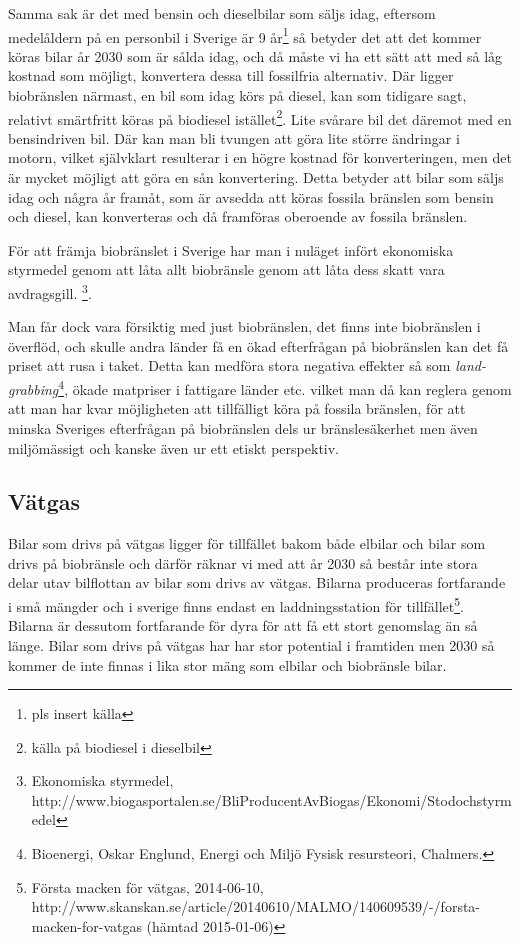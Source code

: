 \documentclass[a4paper,11pt,fleqn, titlepage]{article}
\begin{document}
Samma sak är det med bensin och dieselbilar som säljs idag, eftersom
medelåldern på en personbil i Sverige är 9 år\footnote{pls insert
källa} så betyder det att det kommer köras bilar år 2030 som är sålda idag,
och då måste vi ha ett sätt att med så låg kostnad som möjligt, konvertera
dessa till fossilfria alternativ. Där ligger biobränslen närmast, en bil
som idag körs på diesel, kan som tidigare sagt, relativt smärtfritt köras
på biodiesel istället\footnote{källa på biodiesel i dieselbil}. Lite
svårare bil det däremot med en bensindriven bil. Där kan man bli tvungen
att göra lite större ändringar i motorn, vilket självklart resulterar i en
högre kostnad för konverteringen, men det är mycket möjligt att göra en sån
konvertering. Detta betyder att bilar som säljs idag och några år framåt,
som är avsedda att köras fossila bränslen som bensin och diesel, kan
konverteras och då framföras oberoende av fossila bränslen.

För att främja biobränslet i Sverige har man i nuläget infört ekonomiska styrmedel 
genom att låta allt biobränsle genom att låta dess skatt vara
avdragsgill.
\footnote{Ekonomiska styrmedel, \\
http://www.biogasportalen.se/BliProducentAvBiogas/Ekonomi/Stodochstyrmedel}.

Man får dock vara försiktig med just biobränslen, det finns inte
biobränslen i överflöd, och skulle andra länder få en ökad efterfrågan på
biobränslen kan det få priset att rusa i taket. Detta kan medföra stora
negativa effekter så som \emph{land-grabbing}\footnote{Bioenergi, Oskar
Englund, Energi och Miljö Fysisk resursteori, Chalmers.}, ökade matpriser i
fattigare länder etc. vilket man då kan reglera genom att man har kvar
möjligheten att tillfälligt köra på fossila bränslen, för att minska
Sveriges efterfrågan på biobränslen dels ur bränslesäkerhet men även
miljömässigt och kanske även ur ett etiskt perspektiv.

\subsection{Vätgas}
Bilar som drivs på vätgas ligger för tillfället bakom både elbilar och bilar som drivs på biobränsle och därför räknar vi med att år 2030 så består inte stora delar utav bilflottan av bilar som drivs av vätgas. Bilarna produceras fortfarande i små mängder och i sverige finns endast en laddningsstation för tillfället\footnote{Första macken för vätgas, 2014-06-10, \\
http://www.skanskan.se/article/20140610/MALMO/140609539/-/forsta-macken-for-vatgas (hämtad 2015-01-06)}.
Bilarna är dessutom fortfarande för dyra för att få ett stort genomslag än så länge. Bilar som drivs på vätgas har har stor potential i framtiden men 2030 så kommer de inte finnas i lika stor mäng som elbilar och biobränsle bilar.
\end{document}
